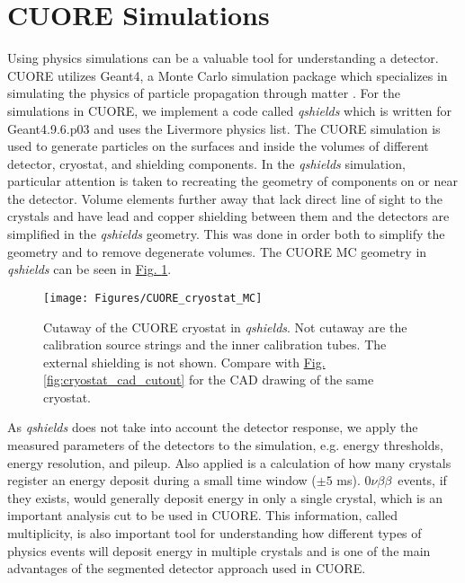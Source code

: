 \documentclass[12pt,a4paper]{article}
\newcommand{\zeronubb}{$0\nu \beta \beta$}
\begin{document}
\section{CUORE Simulations}

Using physics simulations can be a valuable tool for understanding a detector.  CUORE utilizes Geant4, a Monte Carlo simulation package which specializes in simulating the physics of particle propagation through matter \cite{Allison:2006ve}\cite{Agostinelli:2002hh}. For the simulations in CUORE, we implement a code called \textit{qshields} which is written for Geant4.9.6.p03 and uses the Livermore physics list. The CUORE simulation is used to generate particles on the surfaces and inside the volumes of different detector, cryostat, and shielding components. In the \textit{qshields} simulation, particular attention is taken to recreating the geometry of components on or near the detector. Volume elements further away that lack direct line of sight to the crystals and have lead and copper shielding between them and the detectors are simplified in the \textit{qshields} geometry. This was done in order both to simplify the geometry and to remove degenerate volumes. The CUORE MC geometry in \textit{qshields} can be seen in \hyperref[fig:cuorecryostatmc]{Fig. \ref*{fig:cuorecryostatmc}}.

\begin{figure}[htbp]
\centering
\texttt{[image: Figures/CUORE\_cryostat\_MC]}
\caption{Cutaway of the CUORE cryostat in \textit{qshields}. Not cutaway are the calibration source strings and the inner calibration tubes. The external shielding is not shown. Compare with \hyperref[fig:cryostat_cad_cutout]{Fig. \ref*{fig:cryostat_cad_cutout}} for the CAD drawing of the same cryostat.}
\label{fig:cuorecryostatmc}
\end{figure}

As \textit{qshields} does not take into account the detector response, we apply the measured parameters of the detectors to the simulation, e.g. energy thresholds, energy resolution, and pileup. Also applied is a calculation of how many crystals register an energy deposit during a small time window ($\pm5$ ms). \zeronubb~events, if they exists, would generally deposit energy in only a single crystal, which is an important analysis cut to be used in CUORE. This information, called multiplicity, is also important tool for understanding how different types of physics events will deposit energy in multiple crystals and is one of the main advantages of the segmented detector approach used in CUORE.
\end{document}
